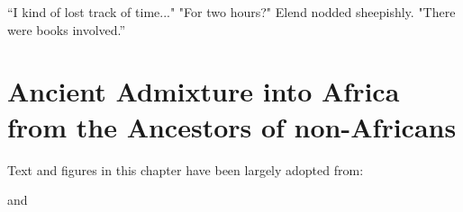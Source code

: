 \begin{savequote}[10cm]

  “I kind of lost track of time..."\newline
  "For two hours?"\newline
  Elend nodded sheepishly. "There were books involved.”
  
\end{savequote}

\chapter{Ancient Admixture into Africa from the Ancestors of non-Africans} \label{ch:aaa}

Text and figures in this chapter have been largely adopted from:

{\small {} }

and 

{\small {}}





